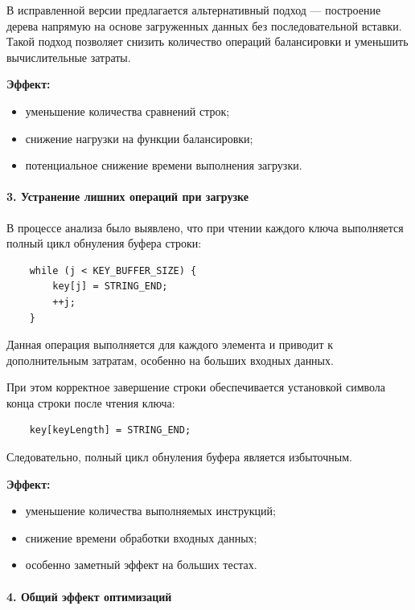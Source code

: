 \documentclass[12pt]{article}
\begin{document}
В исправленной версии предлагается альтернативный подход — построение дерева напрямую на основе загруженных данных без последовательной вставки. Такой подход позволяет снизить количество операций балансировки и уменьшить вычислительные затраты.

\textbf{Эффект:}
\begin{itemize}
	\item уменьшение количества сравнений строк;
	\item снижение нагрузки на функции балансировки;
	\item потенциальное снижение времени выполнения загрузки.
\end{itemize}

\paragraph{3. Устранение лишних операций при загрузке}

В процессе анализа было выявлено, что при чтении каждого ключа выполняется полный цикл обнуления буфера строки:

\begin{verbatim}
	while (j < KEY_BUFFER_SIZE) {
		key[j] = STRING_END;
		++j;
	}
\end{verbatim}

Данная операция выполняется для каждого элемента и приводит к дополнительным затратам, особенно на больших входных данных.

При этом корректное завершение строки обеспечивается установкой символа конца строки после чтения ключа:

\begin{verbatim}
	key[keyLength] = STRING_END;
\end{verbatim}

Следовательно, полный цикл обнуления буфера является избыточным.

\textbf{Эффект:}
\begin{itemize}
	\item уменьшение количества выполняемых инструкций;
	\item снижение времени обработки входных данных;
	\item особенно заметный эффект на больших тестах.
\end{itemize}

\paragraph{4. Общий эффект оптимизаций}
\end{document}

